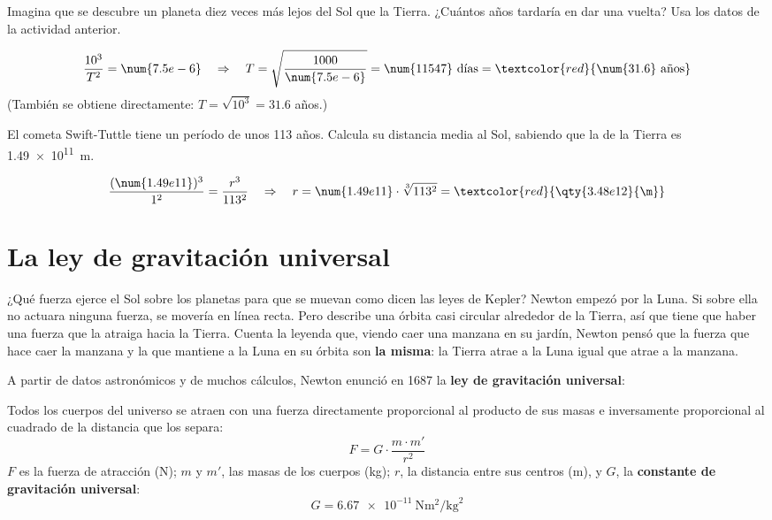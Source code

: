 \begin{exercise}
    Imagina que se descubre un planeta diez veces más lejos del Sol que la Tierra. ¿Cuántos años tardaría en dar una vuelta? Usa los datos de la actividad anterior.
    \begin{solu}
        \[ \frac{10^3}{T^2} = \num{7.5e-6} \quad\Rightarrow\quad T = \sqrt{\frac{1000}{\num{7.5e-6}}} = \num{11547}~\text{días} = \textcolor{red}{\num{31.6}~\text{años}} \]
        (También se obtiene directamente: \(T = \sqrt{10^3} = \num{31.6}\) años.)
    \end{solu}
\end{exercise}

\begin{exercise}
    El cometa Swift-Tuttle tiene un período de unos 113 años. Calcula su distancia media al Sol, sabiendo que la de la Tierra es \qty{1.49e11}{\m}.
    \begin{solu}
        \[ \frac{(\num{1.49e11})^3}{1^2} = \frac{r^3}{113^2} \quad\Rightarrow\quad r = \num{1.49e11} \cdot \sqrt[3]{113^2} = \textcolor{red}{\qty{3.48e12}{\m}} \]
    \end{solu}
\end{exercise}

\section{La ley de gravitación universal}

¿Qué fuerza ejerce el Sol sobre los planetas para que se muevan como dicen las leyes de Kepler? Newton empezó por la Luna. Si sobre ella no actuara ninguna fuerza, se movería en línea recta. Pero describe una órbita casi circular alrededor de la Tierra, así que tiene que haber una fuerza que la atraiga hacia la Tierra. Cuenta la leyenda que, viendo caer una manzana en su jardín, Newton pensó que la fuerza que hace caer la manzana y la que mantiene a la Luna en su órbita son \textbf{la misma}: la Tierra atrae a la Luna igual que atrae a la manzana.

A partir de datos astronómicos y de muchos cálculos, Newton enunció en 1687 la \textbf{ley de gravitación universal}:

\begin{definition}
    Todos los cuerpos del universo se atraen con una fuerza directamente proporcional al producto de sus masas e inversamente proporcional al cuadrado de la distancia que los separa:
    \[ F = G \cdot \frac{m \cdot m'}{r^2} \]
    \(F\) es la fuerza de atracción (\unit{\newton}); \(m\) y \(m'\), las masas de los cuerpos (\unit{\kg}); \(r\), la distancia entre sus centros (\unit{\m}), y \(G\), la \textbf{constante de gravitación universal}:
    \[ G = \qty{6.67e-11}{\newton\square\m\per\square\kg} \]
\end{definition}


